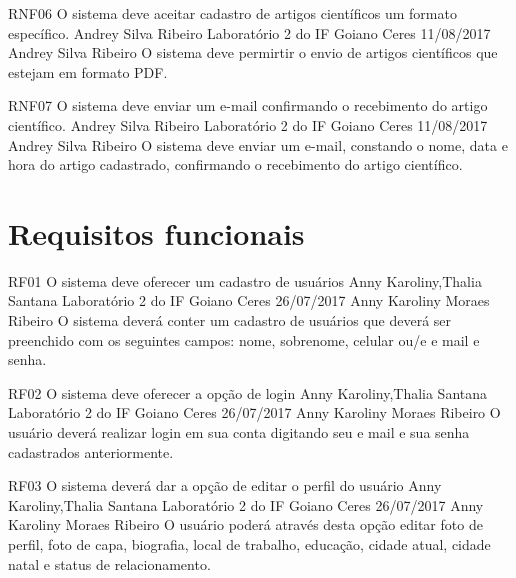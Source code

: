    \requisitoNaoFuncional
 {RNF06}
 {O sistema deve aceitar cadastro de artigos científicos um formato específico.}
 {Andrey Silva Ribeiro}
 {Laboratório 2 do IF Goiano Ceres}
 {11/08/2017}
 {Andrey Silva Ribeiro}
 {O sistema deve permirtir o envio de artigos científicos que estejam em formato PDF.
 }
 
    \requisitoNaoFuncional
 {RNF07}
 {O sistema deve enviar um e-mail confirmando o recebimento do artigo científico.}
 {Andrey Silva Ribeiro}
 {Laboratório 2 do IF Goiano Ceres}
 {11/08/2017}
 {Andrey Silva Ribeiro}
 {O sistema deve enviar um e-mail, constando o nome, data e hora do artigo cadastrado, confirmando o recebimento do artigo científico.
 }

 \section{Requisitos funcionais}
 	
 \requisitoFuncional
 {RF01}
 {O sistema deve oferecer um cadastro de usuários}
 {Anny Karoliny,Thalia Santana}
 {Laboratório 2 do IF Goiano Ceres}
 {26/07/2017}
 {Anny Karoliny Moraes Ribeiro}
 {O sistema deverá conter um cadastro de usuários que deverá ser preenchido com os seguintes campos: nome, sobrenome, celular ou/e e mail e senha.
 }
 
 \requisitoFuncional
 {RF02}
 {O sistema deve oferecer a opção de login}
 {Anny Karoliny,Thalia Santana}
 {Laboratório 2 do IF Goiano Ceres}
 {26/07/2017}
 {Anny Karoliny Moraes Ribeiro}
 {O usuário deverá realizar login em sua conta digitando seu e mail e sua senha cadastrados anteriormente.
 }
 
 \requisitoFuncional
 {RF03}
 {O sistema deverá dar a opção de editar o perfil do usuário}
 {Anny Karoliny,Thalia Santana}
 {Laboratório 2 do IF Goiano Ceres}
 {26/07/2017}
 {Anny Karoliny Moraes Ribeiro}
 {O usuário poderá através desta opção editar  foto de perfil, foto de capa, biografia, local de trabalho, educação, cidade atual, cidade natal e status de relacionamento.
 }
 
